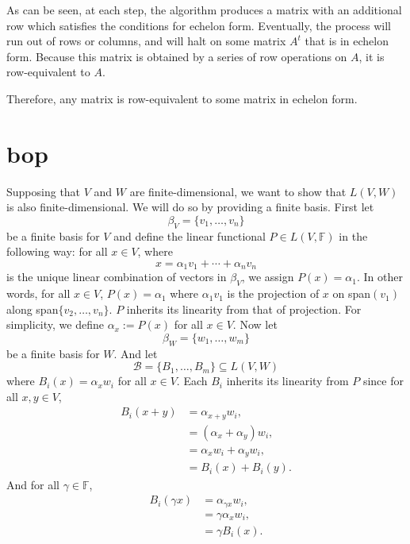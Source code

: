 \documentclass[12pt]{article}
\newcommand{\F}{\mathbb{F}}
\newcommand{\B}{\mathcal{B}}
\begin{document}
As can be seen, at each step, the algorithm produces a matrix with an additional row which satisfies the conditions for echelon form. Eventually, the process will run out of rows or columns, and will halt on some matrix $A^t$ that is in echelon form. Because this matrix is obtained by a series of row operations on $A$, it is row-equivalent to $A$.

Therefore, any matrix is row-equivalent to some matrix in echelon form.


\section{bop}

Supposing that $V$ and $W$ are finite-dimensional, we want to show that $L(V,W)$ is also finite-dimensional. We will do so by providing a finite basis. First let
\[\beta_V = \{v_1, \dots, v_n\}\]
be a finite basis for $V$ and define the linear functional $P\in L(V,\F)$ in the following way: for all $x\in V$, where
\[x = \alpha_1 v_1 + \cdots + \alpha_n v_n\]
is the unique linear combination of vectors in $\beta_V$, we assign $P(x)=\alpha_1$. In other words, for all $x\in V$, $P(x)=\alpha_1$ where $\alpha_1v_1$ is the projection of $x$ on span$(v_1)$ along span$\{v_2,\dots,v_n\}$. $P$ inherits its linearity from that of projection. For simplicity, we define $\alpha_x := P(x)$ for all $x\in V$. Now let
\[\beta_W = \{w_1, \dots, w_m\}\]
be a finite basis for $W$. And let
\[\B = \{B_1, \dots, B_m\} \subseteq L(V,W)\]
where $B_i(x) = \alpha_x w_i$ for all $x\in V$. Each $B_i$ inherits its linearity from $P$ since for all $x,y\in V$,
\begin{align*}
    B_i(x+y)    &= \alpha_{x+y}w_i, \\
                &= (\alpha_x + \alpha_y)w_i, \\
                &= \alpha_x w_i + \alpha_y w_i, \\
                &= B_i(x) + B_i(y).
\end{align*}
And for all $\gamma\in\F$,
\begin{align*}
    B_i(\gamma x)   &= \alpha_{\gamma x}w_i, \\
                    &= \gamma\alpha_x w_i, \\
                    &= \gamma B_i(x).
\end{align*}
\end{document}
